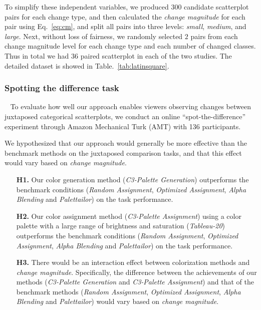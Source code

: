 To simplify these independent variables, we produced 300 candidate scatterplot pairs for each change type, and then calculated the \emph{change magnitude} for each pair using Eq.~\ref{eq:cm}, and split all  pairs into three levels: \emph{small}, \emph{medium}, and \emph{large}.
Next, without loss of fairness, we randomly selected $2$ pairs from each change magnitude level for each change type and each number of changed classes. Thus in total we had $36$ paired scatterplot in each of the two studies. The detailed dataset is showed in Table.~\ref{tab:latinsquare}.

\subsubsection{Spotting the difference task}
\
\newline
To evaluate how well our approach enables viewers observing changes between juxtaposed categorical scatterplots, we conduct an online ``spot-the-difference'' experiment through Amazon Mechanical Turk (AMT) with 136 participants.

\vspace{.3em}
 We hypothesized that our approach would generally be more effective than the benchmark methods on the juxtaposed comparison tasks, and that this effect would vary based on \emph{change magnitude}.
\begin{itemize}[noitemsep]
\setlength{\itemsep}{5pt}
    \item[\textbf{H1.}] Our color generation method (\emph{C3-Palette Generation}) outperforms the benchmark conditions (\emph{Random Assignment}, \emph{Optimized Assignment}, \emph{Alpha Blending} and \emph{Palettailor}) on the task performance.

    \item [\textbf{H2.}] Our color assignment method (\emph{C3-Palette Assignment}) using a color palette with a large range of brightness and saturation (\emph{Tableau-20}) outperforms the benchmark conditions (\emph{Random Assignment}, \emph{Optimized Assignment}, \emph{Alpha Blending} and \emph{Palettailor}) on the task performance.

    \item [\textbf{H3.}] There would be an interaction effect between colorization methods and \emph{change magnitude}. Specifically, the difference between the achievements of our methods (\emph{C3-Palette Generation} and \emph{C3-Palette Assignment}) and that of the benchmark methods (\emph{Random Assignment}, \emph{Optimized Assignment}, \emph{Alpha Blending} and \emph{Palettailor}) would vary based on \emph{change magnitude}.
\end{itemize}

